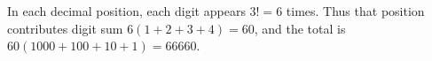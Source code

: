 In each decimal position, each digit appears $3!=6$ times. Thus that position contributes digit sum $6(1+2+3+4)=60$, and the total is $60(1000+100+10+1)=\boxed{66660}$.
